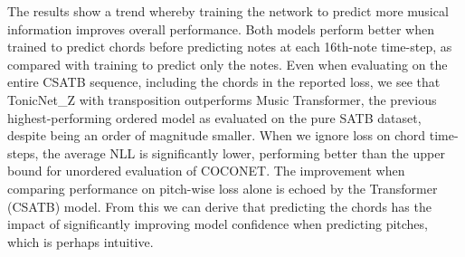 \documentclass{article}
\begin{document}
The results show a trend whereby training the network to predict more musical information improves overall performance. Both models perform better when trained to predict chords before predicting notes at each 16th-note time-step, as compared with training to predict only the notes. Even when evaluating on the entire CSATB sequence, including the chords in the reported loss, we see that TonicNet\_Z with transposition outperforms Music Transformer, the previous highest-performing ordered model as evaluated on the pure SATB dataset, despite being an order of magnitude smaller. When we ignore loss on chord time-steps, the average NLL is significantly lower, performing better than the upper bound for unordered evaluation of COCONET. The improvement when comparing performance on pitch-wise loss alone is echoed by the Transformer (CSATB) model. From this we can derive that predicting the chords has the impact of significantly improving model confidence when predicting pitches, which is perhaps intuitive.
\newcommand{\astfootnote}[1]{
\let\oldthefootnote=\thefootnote
\setcounter{footnote}{0}
\renewcommand{\thefootnote}{\fnsymbol{footnote}}
\footnote{#1}
\let\thefootnote=\oldthefootnote
}
\end{document}
